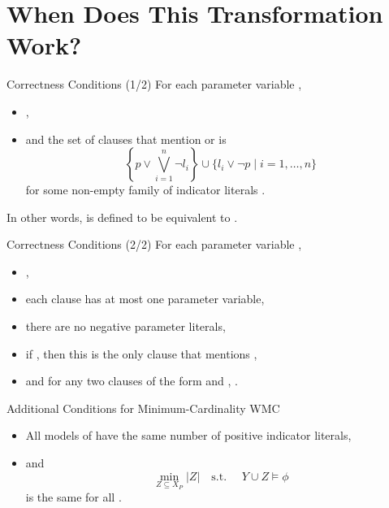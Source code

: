 \documentclass{beamer}
\begin{document}
\section{When Does This Transformation Work?}

\begin{frame}{Correctness Conditions (1/2)}
  For each parameter variable ,
  \begin{itemize}
  \item {},
  \item and the set of clauses that mention  or  is
    \[
      \left\{p \lor \bigvee_{i=1}^n \neg l_i \right\} \cup \{ l_i \lor \neg p
      \mid i = 1, \dots, n \}
    \]
    for some non-empty family of \alert{indicator} literals
    .
  \end{itemize}
  In other words,  is defined to be equivalent to
  .
\end{frame}

\begin{frame}{Correctness Conditions (2/2)}
  For each parameter variable ,
  \begin{itemize}
  \item {},
  \item each clause has at most one parameter variable,
  \item there are no negative parameter literals,
  \item if , then this is the only clause that
    mentions ,
  \item and for any two clauses of the form  and
    , \structure{$\chi \land \psi \equiv \bot$}.
  \end{itemize}
\end{frame}

\begin{frame}{Additional Conditions for Minimum-Cardinality WMC}
  \begin{itemize}
  \item All models of 
    have the same number of positive indicator literals,
  \item and
    \[
      \min_{Z \subseteq X_P} |Z| \quad \text{s.t. } \quad Y \cup Z \models \phi
    \]
    is the same for all .
  \end{itemize}
\end{frame}
\end{document}
